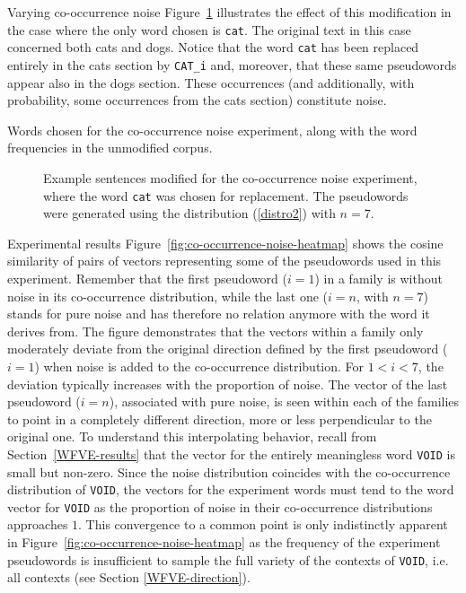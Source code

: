 \documentclass{article} %
\newcommand{\word}[1]{\texttt{#1}}
\begin{document}
\begin{section}{Varying co-occurrence noise}
Figure~\ref{fig:co-occurrence-noise-experiment-text} illustrates the
effect of this modification in the case where the only word chosen is
\word{cat}.  The original text in this case concerned both cats and
dogs.  Notice that the word \word{cat} has been replaced entirely in the
cats section by \word{CAT\_i} and, moreover, that these same pseudowords
appear also in the dogs section. These occurrences (and additionally,
with probability, some occurrences from the cats section) constitute
noise.

\begin{table}
	
	\label{fig:co-occurrence-noise-counts}
	\caption{Words chosen for the co-occurrence noise experiment,
          along with the word frequencies in the unmodified corpus. }
	\label{cooccurrence-noise-words}
\end{table}

\begin{figure}
	\begin{mdframed}
	
	\end{mdframed}
	\caption{Example sentences modified for the co-occurrence noise
          experiment, where the word \word{cat} was chosen for
          replacement.  The pseudowords were generated using the distribution
          (\ref{distro2}) with $n=7$.}
	\label{fig:co-occurrence-noise-experiment-text}
\end{figure}

\begin{subsection}{Experimental results}
%
Figure~\ref{fig:co-occurrence-noise-heatmap} shows the cosine similarity
of pairs of vectors representing some of the pseudowords used in this
experiment.  Remember that the first pseudoword ($i=1$) in a family is
without noise in its co-occurrence distribution, while the last one
($i=n$, with $n=7$) stands for pure noise and has therefore no relation
anymore with the word it derives from.  The figure demonstrates that the
vectors within a family only moderately deviate from the original
direction defined by the first pseudoword ($i=1$) when noise is added to the
co-occurrence distribution.  For $1<i<7$, the deviation typically
increases with the proportion of noise.  The vector of the last pseudoword
($i=n$), associated with pure noise, is seen within each of the families
to point in a completely different direction, more or less perpendicular
to the original one.  To understand this interpolating behavior, recall
from Section~\ref{WFVE-results} that the vector for the entirely
meaningless word \word{VOID} is small but non-zero.  Since the noise
distribution coincides with the co-occurrence distribution of
\word{VOID}, the vectors for the experiment words must tend to the word
vector for \word{VOID} as the proportion of noise in their co-occurrence
distributions approaches $1$.
This convergence to a common point is only indistinctly apparent in
Figure~\ref{fig:co-occurrence-noise-heatmap} as the frequency of the experiment
pseudowords is insufficient to sample the full variety of the contexts of
\word{VOID}, i.e.  all contexts (see Section \ref{WFVE-direction}).


\end{subsection}
\end{section}
\end{document}
